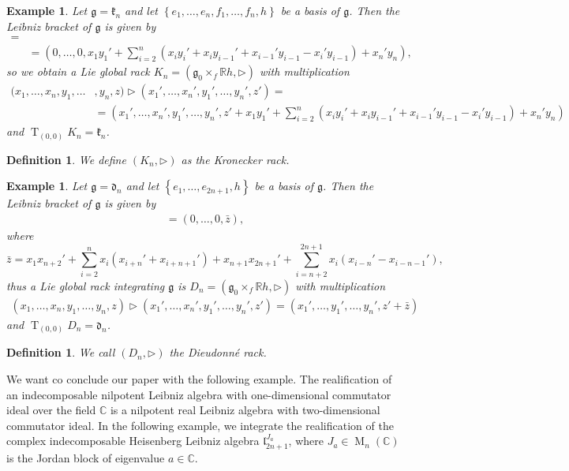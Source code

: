 \documentclass[english,4paper,10pt]{article}
\newcommand{\mg}{\mathfrak{g}}
\newtheorem{definition}[thm]{Definition}
\newtheorem{ex}[thm]{Example}
\begin{document}
\begin{ex}
	Let $\mg=\mathfrak{k}_{n}$ and let $\left\{e_1,\ldots,e_n,f_1,\ldots,f_n,h\right\}$ be a basis of $\mg$. Then the Leibniz bracket of $\mg$ is given by
	\begin{align*}
	[(x_1,\ldots,x_n, y_1,\ldots, y_n, z),&(x_1',\ldots,x_n', y_1',\ldots, y_n', z')]=\\
	&=\left(0,\ldots,0,x_1y_1'+\sum_{i=2}^{n}(x_iy_i'+x_iy_{i-1}'+
	x_{i-1}'y_{i-1}-x_{i}'y_{i-1})+x_n'y_n\right),
	\end{align*}
	so we obtain a Lie global rack $K_n=(\mg_0\times_f \mathbb{R}h,\rhd)$ with multiplication 
	\begin{align*}
		(x_1,\ldots,x_n,y_1,\ldots&,y_n,z)\rhd (x_1',\ldots,x_n',y_1',\ldots,y_n',z')=\\ &=\left(x_1',\ldots,x_n',y_1',\ldots,y_n',z'+x_1y_1'+\sum_{i=2}^{n}(x_iy_i'+x_iy_{i-1}'+
		x_{i-1}'y_{i-1}-x_{i}'y_{i-1})+x_n'y_n\right)
	\end{align*}
	and $\operatorname{T}_{(0,0)}K_{n}=\mathfrak{k}_{n}$.
\end{ex}

\begin{definition}
	We define $(K_n,\rhd)$ as the \emph{Kronecker rack}.
\end{definition}

\begin{ex}
	Let $\mg=\mathfrak{d}_{n}$ and let $\left\{e_1,\ldots,e_{2n+1},h\right\}$ be a basis of $\mg$. Then the Leibniz bracket of $\mg$ is given by
	\begin{align*}
		[(x_1,\ldots,x_{2n+1},z),&(x_1',\ldots,x_{2n+1}', z')]=(0,\ldots,0,\bar{z}),
	\end{align*}
    where
    $$
    \bar{z}=x_1x_{n+2}'+\sum_{i=2}^{n}x_i(x_{i+n}'+x_{i+n+1}')+x_{n+1}x_{2n+1}'+\sum_{i=n+2}^{2n+1}x_i(x_{i-n}'-x_{i-n-1}'),
    $$
	thus a Lie global rack integrating $\mg$ is $D_n=(\mg_0\times_f \mathbb{R}h,\rhd)$ with multiplication 
	\begin{align*}
		(x_1,\ldots,x_n,y_1,\ldots,y_n,z)\rhd (x_1',\ldots,x_n',y_1',\ldots,y_n',z')=(x_1',\ldots,y_1',\ldots,y_n',z'+\bar{z})
	\end{align*}
and $\operatorname{T}_{(0,0)}D_{n}=\mathfrak{d}_{n}$.
\end{ex}

\begin{definition}
	We call $(D_n,\rhd)$ the \emph{Dieudonné rack}.
\end{definition}

We want co conclude our paper with the following example. The realification of an indecomposable nilpotent Leibniz algebra with one-dimensional commutator ideal over the field $\mathbb{C}$ is a nilpotent real Leibniz algebra with two-dimensional commutator ideal. In the following example, we integrate the realification of the complex indecomposable Heisenberg Leibniz algebra $\mathfrak{l}_{2n+1}^{J_a}$, where $J_a \in \operatorname{M}_n(\mathbb{C})$ is the Jordan block of eigenvalue $a \in \mathbb{C}$. 
\end{document}
